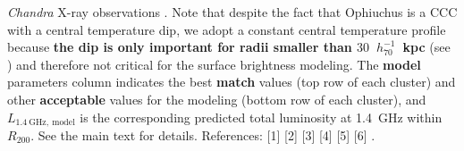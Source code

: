 \documentclass[traditabstract]{aa}
\def\C#1{{\bf #1}}
\newcommand{\rmn}{\mathrm}
\begin{document}
\begin{table}[t]
{  {\em Chandra} X-ray observations \citep{2005ApJ...628..655V}. Note that
  despite the fact that Ophiuchus is a CCC with a central temperature dip, we
  adopt a constant central temperature profile because \C{the dip is only important for 
  radii smaller than $30$~$h_{70}^{-1}$~kpc} (see \citealp{2010MNRAS.405.1624M}) 
  and therefore not critical for the surface brightness modeling. The \C{model} parameters column
  indicates the best \C{match} values (top row of each cluster) and other \C{acceptable}
  values for the modeling (bottom row of each cluster), and
  $L_{1.4~\rmn{GHz},~\rmn{model}}$ is the corresponding predicted total
  luminosity at 1.4~GHz within $R_{200}$. See the main text for
  details. References: [1] \cite{1997A&A...321...55D} [2]
  \cite{1992A&A...259L..31B} [3] \cite{2002ApJ...567..716R} [4]
  \cite{2009A&A...499..679M} [5] \cite{1990MNRAS.246..477P} [6]
  \cite{2003ApJ...590..225C}.}
\end{table}
\end{document}
